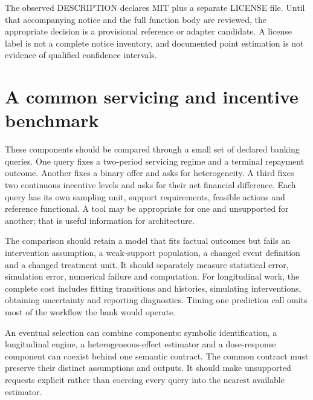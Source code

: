The observed DESCRIPTION declares MIT plus a separate LICENSE file. Until that
accompanying notice and the full function body are reviewed, the appropriate
decision is a provisional reference or adapter candidate. A license label is
not a complete notice inventory, and documented point estimation is not
evidence of qualified confidence intervals.\cite{v13_sw_causaldrf}

\section{A common servicing and incentive benchmark}

These components should be compared through a small set of declared banking
queries. One query fixes a two-period servicing regime and a terminal repayment
outcome. Another fixes a binary offer and asks for heterogeneity. A third fixes
two continuous incentive levels and asks for their net financial difference.
Each query has its own sampling unit, support requirements, feasible actions
and reference functional. A tool may be appropriate for one and unsupported
for another; that is useful information for architecture.

The comparison should retain a model that fits factual outcomes but fails an
intervention assumption, a weak-support population, a changed event definition
and a changed treatment unit. It should separately measure statistical error,
simulation error, numerical failure and computation. For longitudinal work,
the complete cost includes fitting transitions and histories, simulating
interventions, obtaining uncertainty and reporting diagnostics. Timing one
prediction call omits most of the workflow the bank would operate.

An eventual selection can combine components: symbolic identification, a
longitudinal engine, a heterogeneous-effect estimator and a dose-response
component can coexist behind one semantic contract. The common contract must
preserve their distinct assumptions and outputs. It should make unsupported
requests explicit rather than coercing every query into the nearest available
estimator.

